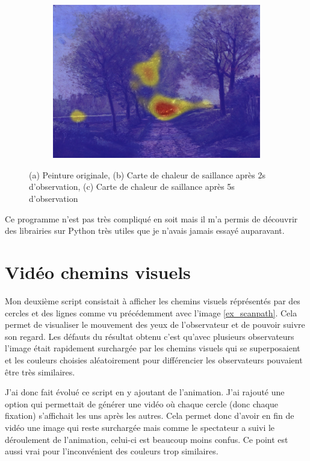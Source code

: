 \begin{figure}[!ht]
\begin{subfigure}{.3\textwidth}
        \includegraphics[width=\linewidth]{datas/fondu_05.jpg}
        \caption{}
    \end{subfigure}
    \caption{(a) Peinture originale, (b) Carte de chaleur de saillance après 2s d'observation, (c) Carte de chaleur de saillance après 5s d'observation}
    \label{fondu}
\end{figure}

\par
Ce programme n'est pas très compliqué en soit mais il m'a permis de découvrir des librairies sur Python très utiles que je n'avais jamais essayé auparavant.

\section{Vidéo chemins visuels}

Mon deuxième script consistait à afficher les chemins visuels réprésentés par des cercles et des lignes comme vu précédemment avec l'image \ref{ex_scanpath}. Cela permet de visualiser le mouvement des yeux de l'observateur et de pouvoir suivre son regard. Les défauts du résultat obtenu c'est qu'avec plusieurs observateurs l'image était rapidement surchargée par les chemins visuels qui se superposaient et les couleurs choisies aléatoirement pour différencier les observateurs pouvaient être très similaires.

\par
J'ai donc fait évolué ce script en y ajoutant de l'animation. J'ai rajouté une option qui permettait de générer une vidéo où chaque cercle (donc chaque fixation) s'affichait les uns après les autres. Cela permet donc d'avoir en fin de vidéo une image qui reste surchargée mais comme le spectateur a suivi le déroulement de l'animation, celui-ci est beaucoup moins confus. Ce point est aussi vrai pour l'inconvénient des couleurs trop similaires.